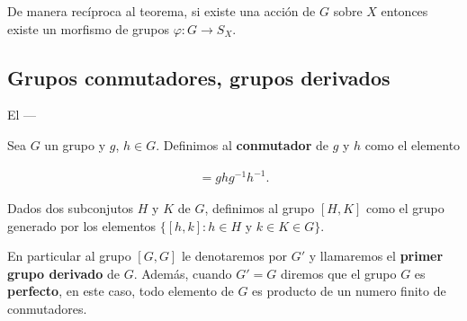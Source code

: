 	\begin{nt}
	De manera recíproca al teorema, si existe una acción de $G$ sobre $X$ entonces existe un morfismo de grupos $\varphi:G \to S_X$.  
	\end{nt}
	
\subsection*{Grupos conmutadores, grupos derivados}

El --- 
\begin{df}
Sea $G$ un grupo y $g$, $h \in G$. Definimos al \textbf{conmutador} de $g$ y $h$ como el elemento 

\begin{align*}
[g,h]=ghg^{-1}h^{-1}.
\end{align*}

Dados dos subconjutos $H$ y $K$ de $G$, definimos al grupo $[H,K]$ como el grupo generado por los elementos $\{[h,k]:h \in H \text{ y }k \in K \in G \}$.

 En particular al grupo $[G,G]$ le denotaremos por $G'$ y llamaremos el \textbf{primer grupo derivado} de $G$. Además, cuando $ G' = G $ diremos que el grupo $G$ es \textbf{perfecto}, en este caso, todo elemento de $G$ es producto de un numero finito de conmutadores. 
\end{df}
	
